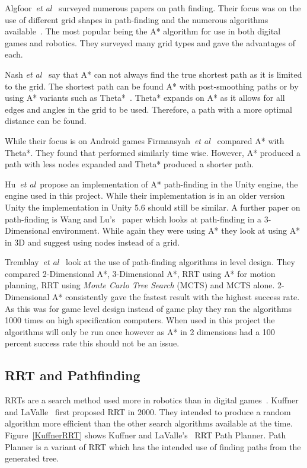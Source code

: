 \documentclass[journal]{IEEEtran}
\begin{document}
Algfoor~\textit{et al}~\cite{Algfoor2015} surveyed numerous papers on path finding. Their focus was on the use of different grid shapes in path-finding and the numerous algorithms available~\cite{Algfoor2015}. The most popular being the A* algorithm for use in both digital games and robotics. They surveyed many grid types and gave the advantages of each. 

Nash \textit{et al}~\cite{Nash2007} say that A* can not always find the true shortest path as it is limited to the grid. The shortest path can be found A* with post-smoothing paths or by using A* variants such as Theta*~\cite{Nash2007,Firmansyah2016}. Theta* expands on A* as it allows for all edges and angles in the grid to be used. Therefore, a path with a more optimal distance can be found.

While their focus is on Android games Firmansyah~\textit{et al}~\cite{Firmansyah2016} compared A* with Theta*. They found that performed similarly time wise. However, A* produced a path with less nodes expanded and Theta* produced a shorter path. 

Hu~\textit{et al}~\cite{Hu2012}propose an implementation of A* path-finding in the Unity engine, the engine used in this project.  While their implementation is in an older version Unity the implementation in Unity 5.6 should still be similar. A further paper on path-finding is Wang and Lu's~\cite{wang2012} paper which looks at path-finding in a 3-Dimensional environment. While again they were using A* they look at using A* in 3D and suggest using nodes instead of a grid.

Tremblay~\textit{et al}~\cite{Tremblay2014} look at the use of path-finding algorithms in level design. They compared 2-Dimensional A*, 3-Dimensional A*, RRT using A* for motion planning, RRT using \textit{Monte Carlo Tree Search} (MCTS) and MCTS alone. 2-Dimensional A* consistently gave the fastest result with the highest success rate. As this was for game level design instead of game play they ran the algorithms 1000 times on high specification computers. When used in this project the algorithms will only be run once however as A* in 2 dimensions had a 100 percent success rate this should not be an issue. 

\subsection{RRT and Pathfinding} \label{RRTadnPathfinding}
RRTs are a search method used more in robotics than in digital games~\cite{LaValle1998,Kuffner2000}. Kuffner and LaValle~\cite{Kuffner2000} first proposed RRT in 2000. They intended to produce a random algorithm more efficient than the other search algorithms available at the time.  Figure~\ref{KuffnerRRT} shows Kuffner and LaValle's~\cite{Kuffner2000} RRT Path Planner. Path Planner is a variant of RRT which has the intended use of finding paths from the generated tree.
\end{document}
